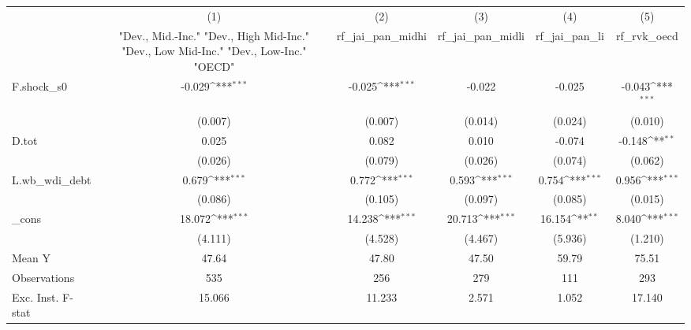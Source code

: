 {
\def\sym#1{\ifmmode^{#1}\else\(^{#1}\)\fi}
\begin{tabular}{l*{5}{c}}
\toprule
            &\multicolumn{1}{c}{(1)}&\multicolumn{1}{c}{(2)}&\multicolumn{1}{c}{(3)}&\multicolumn{1}{c}{(4)}&\multicolumn{1}{c}{(5)}\\
            &\multicolumn{1}{c}{ "Dev., Mid.-Inc." "Dev., High Mid-Inc." "Dev., Low Mid-Inc." "Dev., Low-Inc." "OECD" }&\multicolumn{1}{c}{rf\_jai\_pan\_midhi}&\multicolumn{1}{c}{rf\_jai\_pan\_midli}&\multicolumn{1}{c}{rf\_jai\_pan\_li}&\multicolumn{1}{c}{rf\_rvk\_oecd}\\
\midrule
F.shock\_s0  &      -0.029\sym{***}&      -0.025\sym{***}&      -0.022         &      -0.025         &      -0.043\sym{***}\\
            &     (0.007)         &     (0.007)         &     (0.014)         &     (0.024)         &     (0.010)         \\
\addlinespace
D.tot       &       0.025         &       0.082         &       0.010         &      -0.074         &      -0.148\sym{**} \\
            &     (0.026)         &     (0.079)         &     (0.026)         &     (0.074)         &     (0.062)         \\
\addlinespace
L.wb\_wdi\_debt&       0.679\sym{***}&       0.772\sym{***}&       0.593\sym{***}&       0.754\sym{***}&       0.956\sym{***}\\
            &     (0.086)         &     (0.105)         &     (0.097)         &     (0.085)         &     (0.015)         \\
\addlinespace
\_cons      &      18.072\sym{***}&      14.238\sym{***}&      20.713\sym{***}&      16.154\sym{**} &       8.040\sym{***}\\
            &     (4.111)         &     (4.528)         &     (4.467)         &     (5.936)         &     (1.210)         \\
\midrule
Mean Y      &       47.64         &       47.80         &       47.50         &       59.79         &       75.51         \\
Observations&         535         &         256         &         279         &         111         &         293         \\
Exc. Inst. F-stat&      15.066         &      11.233         &       2.571         &       1.052         &      17.140         \\
\bottomrule
\end{tabular}
}
